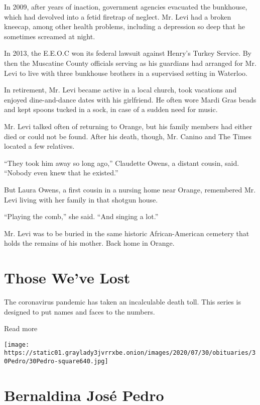 In 2009, after years of inaction, government agencies evacuated the
bunkhouse, which had devolved into a fetid firetrap of neglect. Mr. Levi
had a broken kneecap, among other health problems, including a
depression so deep that he sometimes screamed at night.

In 2013, the E.E.O.C won its federal lawsuit against Henry's Turkey
Service. By then the Muscatine County officials serving as his guardians
had arranged for Mr. Levi to live with three bunkhouse brothers in a
supervised setting in Waterloo.

In retirement, Mr. Levi became active in a local church, took vacations
and enjoyed dine-and-dance dates with his girlfriend. He often wore
Mardi Gras beads and kept spoons tucked in a sock, in case of a sudden
need for music.

Mr. Levi talked often of returning to Orange, but his family members had
either died or could not be found. After his death, though, Mr. Canino
and The Times located a few relatives.

``They took him away so long ago,'' Claudette Owens, a distant cousin,
said. ``Nobody even knew that he existed.''

But Laura Owens, a first cousin in a nursing home near Orange,
remembered Mr. Levi living with her family in that shotgun house.

``Playing the comb,'' she said. ``And singing a lot.''

Mr. Levi was to be buried in the same historic African-American cemetery
that holds the remains of his mother. Back home in Orange.

\href{https://www.nytimes3xbfgragh.onion/interactive/2020/obituaries/people-died-coronavirus-obituaries.html?action=click\&pgtype=Article\&state=default\&region=BELOW_MAIN_CONTENT\&context=covid_obits_promo}{}

\hypertarget{those-weve-lost}{%
\section{Those We've Lost}\label{those-weve-lost}}

The coronavirus pandemic has taken an incalculable death toll. This
series is designed to put names and faces to the numbers.

Read more

\texttt{[image: https://static01.graylady3jvrrxbe.onion/images/2020/07/30/obituaries/30Pedro/30Pedro-square640.jpg]}

\hypertarget{bernaldina-josuxe9-pedro}{%
\section{Bernaldina José Pedro}\label{bernaldina-josuxe9-pedro}}

